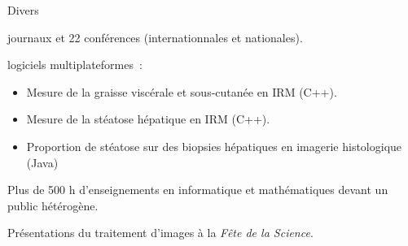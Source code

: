 \begin{rubric}{Divers}

   journaux et 22 conférences
  (internationnales et nationales).

   logiciels multiplateformes~: 
  \begin{itemize}
  \item Mesure de la graisse viscérale et sous-cutanée en IRM (C++).
  \item Mesure de la stéatose hépatique en IRM (C++).
  \item Proportion de stéatose sur des biopsies hépatiques en imagerie
    histologique (Java)
  \end{itemize}

  \entry*[Transmission]  Plus de 500 h d'enseignements en informatique et
  mathématiques devant un public hétérogène. 

  \entry*[Vulgarisation] Présentations du traitement d'images à la \emph{Fête de la Science}. 
  







\end{rubric}
